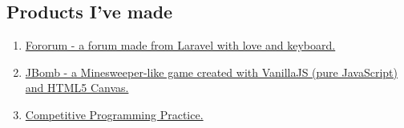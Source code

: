 \documentclass{article}
\begin{document}
        \subsection{Products I've made}
            \begin{enumerate}
                \item \href{https://github.com/trhgquan/Fororum}{Fororum - a forum made from Laravel with love and keyboard.}
                \item \href{https://github.com/trhgquan/JBomb}{JBomb - a Minesweeper-like game created with VanillaJS (pure JavaScript) and HTML5 Canvas.}
                \item \href{https://github.com/trhgquan/CPP}{Competitive Programming Practice.}
            \end{enumerate}

\end{document}
